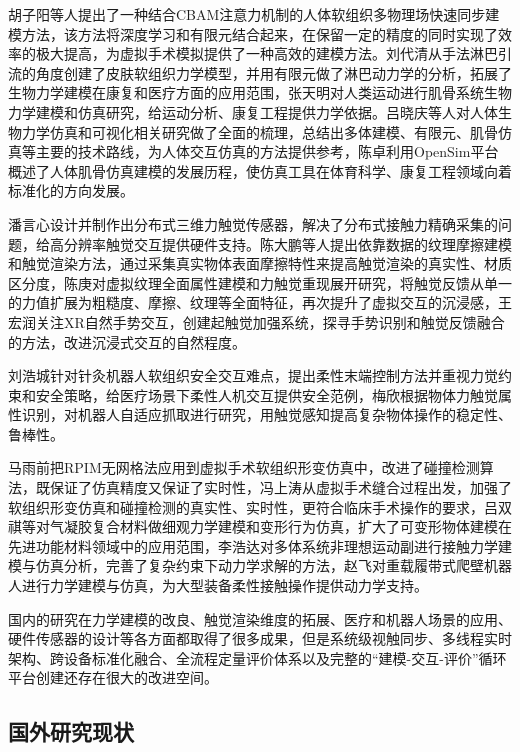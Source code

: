 胡子阳等人提出了一种结合CBAM注意力机制的人体软组织多物理场快速同步建模方法，该方法将深度学习和有限元结合起来，在保留一定的精度的同时实现了效率的极大提高，为虚拟手术模拟提供了一种高效的建模方法\cite{ref1}。刘代清从手法淋巴引流的角度创建了皮肤软组织力学模型，并用有限元做了淋巴动力学的分析，拓展了生物力学建模在康复和医疗方面的应用范围\cite{ref2}，张天明对人类运动进行肌骨系统生物力学建模和仿真研究，给运动分析、康复工程提供力学依据\cite{ref3}。吕晓庆等人对人体生物力学仿真和可视化相关研究做了全面的梳理，总结出多体建模、有限元、肌骨仿真等主要的技术路线，为人体交互仿真的方法提供参考\cite{ref4}，陈卓利用OpenSim平台概述了人体肌骨仿真建模的发展历程，使仿真工具在体育科学、康复工程领域向着标准化的方向发展\cite{ref5}。

潘言心设计并制作出分布式三维力触觉传感器，解决了分布式接触力精确采集的问题，给高分辨率触觉交互提供硬件支持\cite{ref6}。陈大鹏等人提出依靠数据的纹理摩擦建模和触觉渲染方法，通过采集真实物体表面摩擦特性来提高触觉渲染的真实性、材质区分度\cite{ref7}，陈庚对虚拟纹理全面属性建模和力触觉重现展开研究，将触觉反馈从单一的力值扩展为粗糙度、摩擦、纹理等全面特征，再次提升了虚拟交互的沉浸感\cite{ref8}，王宏润关注XR自然手势交互，创建起触觉加强系统，探寻手势识别和触觉反馈融合的方法，改进沉浸式交互的自然程度\cite{ref9}。

刘浩城针对针灸机器人软组织安全交互难点，提出柔性末端控制方法并重视力觉约束和安全策略，给医疗场景下柔性人机交互提供安全范例\cite{ref10}，梅欣根据物体力触觉属性识别，对机器人自适应抓取进行研究，用触觉感知提高复杂物体操作的稳定性、鲁棒性\cite{ref11}。

马雨前把RPIM无网格法应用到虚拟手术软组织形变仿真中，改进了碰撞检测算法，既保证了仿真精度又保证了实时性\cite{ref12}，冯上涛从虚拟手术缝合过程出发，加强了软组织形变仿真和碰撞检测的真实性、实时性，更符合临床手术操作的要求\cite{ref13}，吕双祺等对气凝胶复合材料做细观力学建模和变形行为仿真，扩大了可变形物体建模在先进功能材料领域中的应用范围\cite{ref14}，李浩达对多体系统非理想运动副进行接触力学建模与仿真分析，完善了复杂约束下动力学求解的方法\cite{ref15}，赵飞对重载履带式爬壁机器人进行力学建模与仿真，为大型装备柔性接触操作提供动力学支持\cite{ref16}。

国内的研究在力学建模的改良、触觉渲染维度的拓展、医疗和机器人场景的应用、硬件传感器的设计等各方面都取得了很多成果，但是系统级视触同步、多线程实时架构、跨设备标准化融合、全流程定量评价体系以及完整的``建模-交互-评价''循环平台创建还存在很大的改进空间。

\subsection{国外研究现状}

